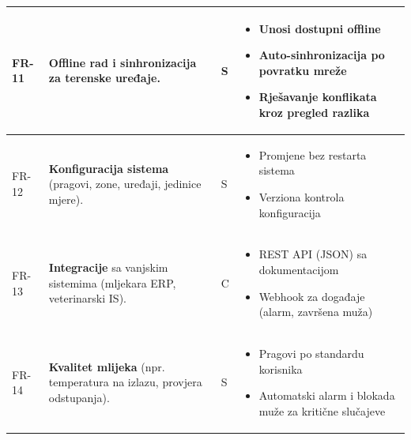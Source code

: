 \documentclass{article}
\begin{document}
\begin{longtable}{|L{1.6cm}|L{8.0cm}|C{0.9cm}|L{6.2cm}|}
FR-11 & \textbf{Offline rad i sinhronizacija} za terenske uređaje. & S &
\begin{minipage}[t]{6.2cm}\vspace{2pt}
\begin{itemize}\setlength\itemsep{2pt}
    \item Unosi dostupni offline
    \item Auto-sinhronizacija po povratku mreže
    \item Rješavanje konflikata kroz pregled razlika
\end{itemize}\vspace{2pt}
\end{minipage} \\
\hline
FR-12 & \textbf{Konfiguracija sistema} (pragovi, zone, uređaji, jedinice mjere). & S &
\begin{minipage}[t]{6.2cm}\vspace{2pt}
\begin{itemize}\setlength\itemsep{2pt}
    \item Promjene bez restarta sistema
    \item Verziona kontrola konfiguracija
\end{itemize}\vspace{2pt}
\end{minipage} \\
\hline
FR-13 & \textbf{Integracije} sa vanjskim sistemima (mljekara ERP, veterinarski IS). & C &
\begin{minipage}[t]{6.2cm}\vspace{2pt}
\begin{itemize}\setlength\itemsep{2pt}
    \item REST API (JSON) sa dokumentacijom
    \item Webhook za događaje (alarm, završena muža)
\end{itemize}\vspace{2pt}
\end{minipage} \\
\hline
FR-14 & \textbf{Kvalitet mlijeka} (npr. temperatura na izlazu, provjera odstupanja). & S &
\begin{minipage}[t]{6.2cm}\vspace{2pt}
\begin{itemize}\setlength\itemsep{2pt}
    \item Pragovi po standardu korisnika
    \item Automatski alarm i blokada muže za kritične slučajeve
\end{itemize}\vspace{2pt}

\end{minipage}
\end{longtable}
\end{document}
